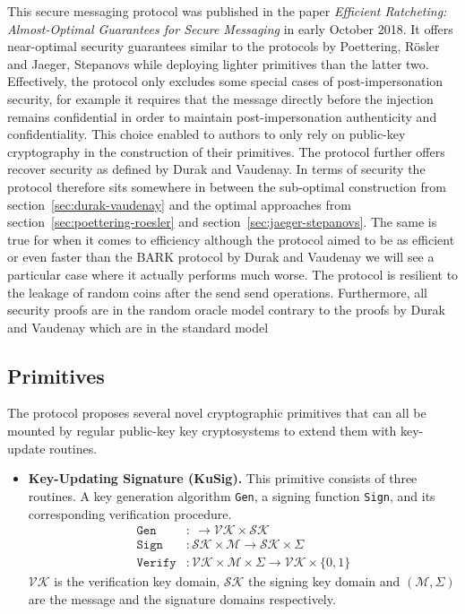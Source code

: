 \documentclass[11pt,a4paper,twoside,openright,bibliography=totoc]{scrbook}
\begin{document}
This secure messaging protocol was published in the paper
\textit{Efficient Ratcheting: Almost-Optimal Guarantees for Secure Messaging}
in early October 2018. It offers near-optimal security guarantees similar
to the protocols by Poettering, Rösler and Jaeger, Stepanovs while
deploying lighter primitives than the latter two. Effectively, the protocol
only excludes some special cases of post-impersonation security,
for example it requires that the message directly before
the injection remains confidential in order to maintain
post-impersonation authenticity and confidentiality. This choice
enabled to authors to only rely on public-key cryptography in
the construction of their primitives. The protocol further
offers recover security as defined by Durak and Vaudenay.
In terms of security the protocol therefore sits somewhere in
between the sub-optimal construction from section~\ref{sec:durak-vaudenay}
and the optimal approaches from section~\ref{sec:poettering-roesler}
and section~\ref{sec:jaeger-stepanovs}. The same is true
for when it comes to efficiency although the protocol aimed
to be as efficient or even faster than the BARK protocol by
Durak and Vaudenay we will see a particular case where it
actually performs much worse.
The protocol is resilient to the leakage of random coins
after the send send operations. Furthermore, all
security proofs are in the random oracle model contrary
to the proofs by Durak and Vaudenay which are in the standard model 

\subsection{Primitives}
\label{sec:primitives-3}

The protocol proposes several novel cryptographic primitives that can all be
mounted by regular public-key key cryptosystems to extend them
with key-update routines.
\begin{itemize}
\item \textbf{Key-Updating Signature (KuSig).} This primitive consists of
  three routines. A key generation algorithm \texttt{Gen}, a signing function
  \texttt{Sign}, and its corresponding verification procedure.
  \begin{align*}
    \texttt{Gen} & : \ \rightarrow \mathcal{VK} \times \mathcal{SK} \\
    \texttt{Sign} & : \mathcal{SK} \times \mathcal{M} \rightarrow \mathcal{SK} \times \Sigma \\
    \texttt{Verify} & : \mathcal{VK} \times \mathcal{M} \times \Sigma
             \rightarrow \mathcal{VK} \times \{0,1\}
  \end{align*}
  $\mathcal{VK}$ is the verification key domain, $\mathcal{SK}$ the signing
  key domain and $(\mathcal{M},\Sigma)$ are the message and the signature domains
  respectively.
\end{itemize}
\end{document}
